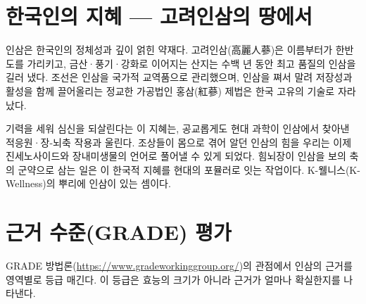 \documentclass[12pt,oneside]{book}
\begin{document}
\section{한국인의 지혜 — 고려인삼의 땅에서}

인삼은 한국인의 정체성과 깊이 얽힌 약재다. 고려인삼(高麗人蔘)은 이름부터가 한반도를 가리키고, 금산·풍기·강화로 이어지는 산지는 수백 년 동안 최고 품질의 인삼을 길러 냈다. 조선은 인삼을 국가적 교역품으로 관리했으며, 인삼을 쪄서 말려 저장성과 활성을 함께 끌어올리는 정교한 가공법인 홍삼(紅蔘) 제법은 한국 고유의 기술로 자라났다.

기력을 세워 심신을 되살린다는 이 지혜는, 공교롭게도 현대 과학이 인삼에서 찾아낸 적응원·장-뇌축 작용과 울린다. 조상들이 몸으로 겪어 알던 인삼의 힘을 우리는 이제 진세노사이드와 장내미생물의 언어로 풀어낼 수 있게 되었다. 힘뇌장이 인삼을 보의 축의 군약으로 삼는 일은 이 한국적 지혜를 현대의 포뮬러로 잇는 작업이다. K-웰니스(K-Wellness)의 뿌리에 인삼이 있는 셈이다.

\section{근거 수준(GRADE) 평가}

GRADE 방법론(\url{https://www.gradeworkinggroup.org/})의 관점에서 인삼의 근거를 영역별로 등급 매긴다. 이 등급은 효능의 크기가 아니라 근거가 얼마나 확실한지를 나타낸다.

\vspace{2pt}\vspace{3pt}
\end{document}
